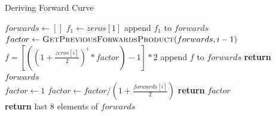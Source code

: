 \documentclass{article}
\begin{document}
\begin{enumerate}
\begin{enumerate}
            \begin{algorithm}[H]
              \caption{Deriving Forward Curve}\label{forward}
              \begin{algorithmic}[1]
                    \State $forwards\gets []$ 
                    \State $f_1 \gets zeros[1]$ 
                    \State append $f_1$ to $forwards$
                     
                        \State $factor \gets \Call{GetPreviousForwardsProduct}{forwards, i-1}$ 
                        \State $f = [((1 + \frac{zeros[i]}{2})^i * factor) - 1] * 2$
                        \State append $f$ to $forwards$
                    \EndFor
                    \State \textbf{return} $forwards$
                \EndFunction
                \[\]
                 
                    \State $factor \gets 1$
                     
                        \State $factor \gets factor / (1 + \frac{forwards[i]}{2})$
                    \EndFor
                    \State \textbf{return} $factor$
                \EndFunction
                \[\]
                 
                    \State \textbf{return} last 8 elements of $forwards$
                \EndFunction
              \end{algorithmic}
            \end{algorithm}


\end{enumerate}
\end{enumerate}
\end{document}
